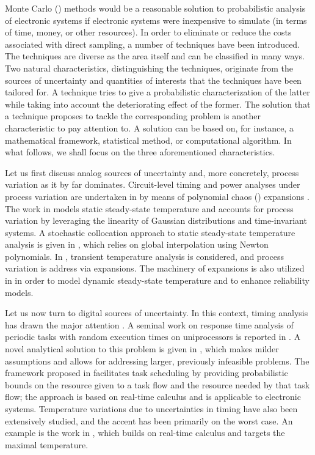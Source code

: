 Monte Carlo () methods would be a reasonable solution to probabilistic
analysis of electronic systems if electronic systems were inexpensive to
simulate (in terms of time, money, or other resources). In order to eliminate or
reduce the costs associated with direct sampling, a number of techniques have
been introduced. The techniques are diverse as the area itself and can be
classified in many ways. Two natural characteristics, distinguishing the
techniques, originate from the sources of uncertainty and quantities of
interests that the techniques have been tailored for. A technique tries to give
a probabilistic characterization of the latter while taking into account the
deteriorating effect of the former. The solution that a technique proposes to
tackle the corresponding problem is another characteristic to pay attention to.
A solution can be based on, for instance, a mathematical framework, statistical
method, or computational algorithm. In what follows, we shall focus on the three
aforementioned characteristics.

Let us first discuss analog sources of uncertainty and, more concretely, process
variation as it by far dominates. Circuit-level timing and power analyses under
process variation are undertaken in \cite{bhardwaj2008} by means of polynomial
chaos () expansions \cite{xiu2010}. The work in \cite{juan2012} models
static steady-state temperature and accounts for process variation by leveraging
the linearity of Gaussian distributions and time-invariant systems. A stochastic
collocation \cite{xiu2010} approach to static steady-state temperature analysis
is given in \cite{lee2013}, which relies on global interpolation using Newton
polynomials. In \cite{ukhov2014}, transient temperature analysis is considered,
and process variation is address via  expansions. The machinery of
 expansions is also utilized in \cite{ukhov2015} in order to model
dynamic steady-state temperature and to enhance reliability models.

Let us now turn to digital sources of uncertainty. In this context, timing
analysis has drawn the major attention \cite{quinton2012}. A seminal work on
response time analysis of periodic tasks with random execution times on
uniprocessors is reported in \cite{diaz2002}. A novel analytical solution to
this problem is given in \cite{tanasa2015}, which makes milder assumptions and
allows for addressing larger, previously infeasible problems. The framework
proposed in \cite{santinelli2011} facilitates task scheduling by providing
probabilistic bounds on the resource given to a task flow and the resource
needed by that task flow; the approach is based on real-time calculus and is
applicable to electronic systems. Temperature variations due to uncertainties in
timing have also been extensively studied, and the accent has been primarily on
the worst case. An example is the work in \cite{yang2013}, which builds on
real-time calculus and targets the maximal temperature.

